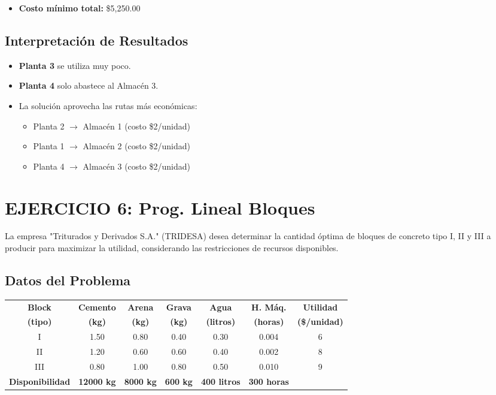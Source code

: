 \documentclass[12pt, a4paper, oneside]{book}
\theoremstyle{definition}
\begin{document}
    \begin{itemize}
    \item \textbf{Costo mínimo total:} \$5,250.00
    \end{itemize}


    \subsection{Interpretación de Resultados}
    \begin{itemize}
    \item \textbf{Planta 3} se utiliza muy poco.
    \item \textbf{Planta 4} solo abastece al Almacén 3.
    \item La solución aprovecha las rutas más económicas:
    \begin{itemize}
    \item Planta 2 $\rightarrow$ Almacén 1 (costo \$2/unidad)
    \item Planta 1 $\rightarrow$ Almacén 2 (costo \$2/unidad)
    \item Planta 4 $\rightarrow$ Almacén 3 (costo \$2/unidad)
    \end{itemize}
    \end{itemize}



    \newpage
    \section{EJERCICIO 6: Prog. Lineal Bloques}

    La empresa "Triturados y Derivados S.A." (TRIDESA) desea determinar la cantidad óptima de bloques de concreto tipo I, II y III a producir para maximizar la utilidad, considerando las restricciones de recursos disponibles.

    \subsection{Datos del Problema}

    \begin{table}[h]
    \centering
    \begin{tabular}{|c|c|c|c|c|c|c|}
    \hline
    \textbf{Block} & \textbf{Cemento} & \textbf{Arena} & \textbf{Grava} & \textbf{Agua} & \textbf{H. Máq.} & \textbf{Utilidad} \\
    \textbf{(tipo)} & \textbf{(kg)} & \textbf{(kg)} & \textbf{(kg)} & \textbf{(litros)} & \textbf{(horas)} & \textbf{(\$/unidad)} \\
    \hline
    I & 1.50 & 0.80 & 0.40 & 0.30 & 0.004 & 6 \\
    II & 1.20 & 0.60 & 0.60 & 0.40 & 0.002 & 8 \\
    III & 0.80 & 1.00 & 0.80 & 0.50 & 0.010 & 9 \\
    \hline
    \textbf{Disponibilidad} & \textbf{12000 kg} & \textbf{8000 kg} & \textbf{600 kg} & \textbf{400 litros} & \textbf{300 horas} & \\
    \hline
    \end{tabular}
    \end{table}
\end{document}
